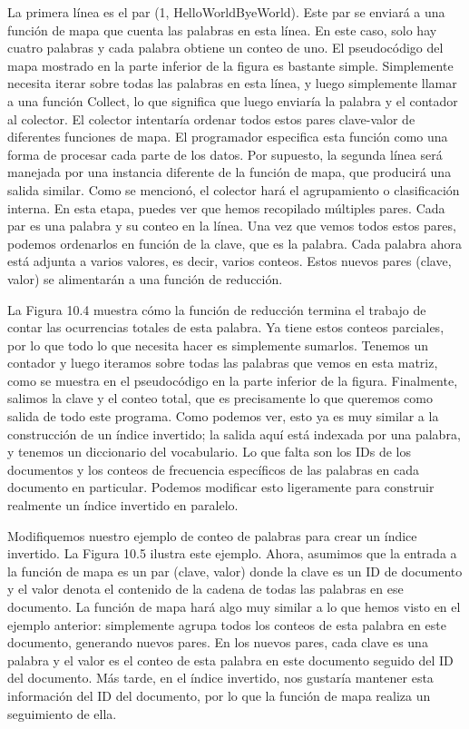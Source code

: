 La primera línea es el par (1, HelloWorldByeWorld). Este par se enviará a una función de mapa que cuenta las palabras en esta línea. En este caso, solo hay cuatro palabras y cada palabra obtiene un conteo de uno. El pseudocódigo del mapa mostrado en la parte inferior de la figura es bastante simple. Simplemente necesita iterar sobre todas las palabras en esta línea, y luego simplemente llamar a una función Collect, lo que significa que luego enviaría la palabra y el contador al colector. El colector intentaría ordenar todos estos pares clave-valor de diferentes funciones de mapa. El programador especifica esta función como una forma de procesar cada parte de los datos. Por supuesto, la segunda línea será manejada por una instancia diferente de la función de mapa, que producirá una salida similar. Como se mencionó, el colector hará el agrupamiento o clasificación interna. En esta etapa, puedes ver que hemos recopilado múltiples pares. Cada par es una palabra y su conteo en la línea. Una vez que vemos todos estos pares, podemos ordenarlos en función de la clave, que es la palabra. Cada palabra ahora está adjunta a varios valores, es decir, varios conteos. Estos nuevos pares (clave, valor) se alimentarán a una función de reducción.

La Figura 10.4 muestra cómo la función de reducción termina el trabajo de contar las ocurrencias totales de esta palabra. Ya tiene estos conteos parciales, por lo que todo lo que necesita hacer es simplemente sumarlos. Tenemos un contador y luego iteramos sobre todas las palabras que vemos en esta matriz, como se muestra en el pseudocódigo en la parte inferior de la figura. Finalmente, salimos la clave y el conteo total, que es precisamente lo que queremos como salida de todo este programa. Como podemos ver, esto ya es muy similar a la construcción de un índice invertido; la salida aquí está indexada por una palabra, y tenemos un diccionario del vocabulario. Lo que falta son los IDs de los documentos y los conteos de frecuencia específicos de las palabras en cada documento en particular. Podemos modificar esto ligeramente para construir realmente un índice invertido en paralelo.

Modifiquemos nuestro ejemplo de conteo de palabras para crear un índice invertido. La Figura 10.5 ilustra este ejemplo. Ahora, asumimos que la entrada a la función de mapa es un par (clave, valor) donde la clave es un ID de documento y el valor denota el contenido de la cadena de todas las palabras en ese documento. La función de mapa hará algo muy similar a lo que hemos visto en el ejemplo anterior: simplemente agrupa todos los conteos de esta palabra en este documento, generando nuevos pares. En los nuevos pares, cada clave es una palabra y el valor es el conteo de esta palabra en este documento seguido del ID del documento. Más tarde, en el índice invertido, nos gustaría mantener esta información del ID del documento, por lo que la función de mapa realiza un seguimiento de ella.

